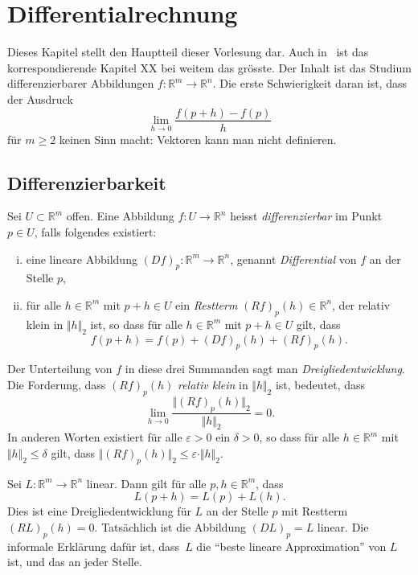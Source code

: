\documentclass[../main.tex]{subfiles}
\begin{document}
\chapter{Differentialrechnung}\label{chp:differential}
Dieses Kapitel stellt den Hauptteil dieser Vorlesung dar.
Auch in~\cite{heuser} ist das korrespondierende
Kapitel XX bei weitem das grösste. Der Inhalt ist das
Studium differenzierbarer Abbildungen 
$f \colon \mathbb{R}^m \to \mathbb{R}^n$.
Die erste Schwierigkeit daran ist, dass der Ausdruck
\[
  \lim_{h \to 0} \frac{f(p + h) - f(p)}{h}
\]
für $m \geq 2$ keinen Sinn macht: Vektoren kann man nicht
definieren.

\section{Differenzierbarkeit}
\begin{definition}
  Sei $U \subset \mathbb{R}^m$ offen. Eine Abbildung
  $f \colon U \to \mathbb{R}^n$ heisst
  \emph{differenzierbar} im Punkt $p \in U$, falls
  folgendes existiert:
  \begin{enumerate}[(i)]
    \item eine lineare Abbildung 
      ${(Df)}_p \colon \mathbb{R}^m \to \mathbb{R}^n$,
      genannt \emph{Differential} von $f$ an
      der Stelle $p$,
    \item für alle $h \in \mathbb{R}^m$ mit $p + h \in U$ 
      ein \emph{Restterm} ${(Rf)}_p(h) \in \mathbb{R}^n$,
      der relativ klein in $\Vert h \Vert_2$ ist,
      so dass für alle $h \in \mathbb{R}^m$ mit $p + h \in U$ 
      gilt, dass
      \[
        f(p+h) = f(p) + {(Df)}_p(h) + {(Rf)}_p(h).
      \]
  \end{enumerate}
  Der Unterteilung von $f$ in diese drei Summanden sagt man
  \emph{Dreigliedentwicklung}. Die Forderung,
  dass ${(Rf)}_p(h)$ \emph{relativ klein} in $\Vert h \Vert_2$ 
  ist, bedeutet, dass
  \[
    \lim_{h \to 0} \frac{\Vert {(Rf)}_p(h)\Vert_2}{\Vert h \Vert_2}
    = 0.
  \]
  In anderen Worten existiert für alle $\varepsilon > 0$ ein $\delta > 0 $,
  so dass für alle $h \in \mathbb{R}^m$ mit $\Vert h \Vert_2
  \leq \delta$ gilt, dass $\Vert {(Rf)}_p(h) \Vert_2
  \leq \varepsilon \cdot \Vert h \Vert_2$.
\end{definition}

\begin{example}
  Sei $L \colon \mathbb{R}^m \to \mathbb{R}^n$ linear.
  Dann gilt für alle $p, h \in \mathbb{R}^m$,
  dass
  \[
    L(p + h) = L(p) + L(h).
  \]
  Dies ist eine Dreigliedentwicklung für $L$ 
  an der Stelle $p$ mit Restterm ${(RL)}_p(h) = 0$.
  Tatsächlich ist die Abbildung ${(DL)}_p = L$ linear.
  Die informale Erklärung dafür ist,
  dass~$L$ die ``beste lineare Approximation'' von $L$ 
  ist, und das an jeder Stelle.
\end{example}
\end{document}
